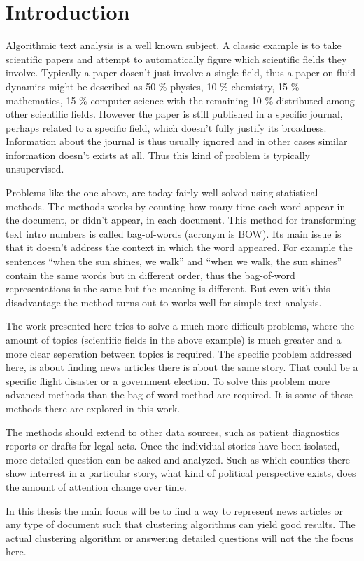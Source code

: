 \chapter{Introduction}

Algorithmic text analysis is a well known subject.
A classic example is to take scientific papers and attempt to automatically figure which scientific fields they involve.
Typically a paper dosen't just involve a single field, thus a paper on fluid dynamics might be described as 50 \% physics, 10 \% chemistry, 15 \% mathematics, 15 \% computer science with the remaining 10 \% distributed among other scientific fields.
However the paper is still published in a specific journal, perhaps related to a specific field, which doesn't fully justify its broadness.
Information about the journal is thus usually ignored and in other cases similar information doesn't exists at all. Thus this kind of problem is typically unsupervised.

Problems like the one above, are today fairly well solved\cite{missing source} using statistical methods.
The methods works by counting how many time each word appear in the document, or didn't appear, in each document.
This method for transforming text intro numbers is called bag-of-words (acronym is BOW).
Its main issue is that it doesn't address the context in which the word appeared.
For example the sentences ``when the sun shines, we walk'' and ``when we walk, the sun shines'' contain the same words but in different order, thus the bag-of-word representations is the same but the meaning is different.
But even with this disadvantage the method turns out to works well for simple text analysis.

The work presented here tries to solve a much more difficult problems, where the amount of topics (scientific fields in the above example) is much greater and a more clear seperation between topics is required.
The specific problem addressed here, is about finding news articles there is about the same story.
That could be a specific flight disaster or a government election.
To solve this problem more advanced methods than the bag-of-word method are required.
It is some of these methods there are explored in this work.

The methods should extend to other data sources, such as patient diagnostics reports or drafts for legal acts.
Once the individual stories have been isolated, more detailed question can be asked and analyzed. Such as which counties there show interrest in a particular story, what kind of political perspective exists, does the amount of attention change over time.

In this thesis the main focus will be to find a way to represent news articles or any type of document such that clustering algorithms can yield good results. The actual clustering algorithm or answering detailed questions will not the the focus here.
